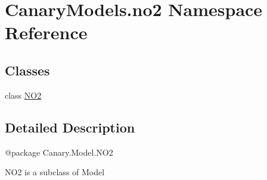\hypertarget{namespace_canary_models_1_1no2}{\section{Canary\-Models.\-no2 Namespace Reference}
\label{namespace_canary_models_1_1no2}
}
\subsection*{Classes}
\begin{DoxyCompactItemize}
\item 
class \hyperlink{class_canary_models_1_1no2_1_1_n_o2}{N\-O2}
\end{DoxyCompactItemize}


\subsection{Detailed Description}
\begin{DoxyVerb}@package Canary.Model.NO2

NO2 is a subclass of Model
\end{DoxyVerb}
 